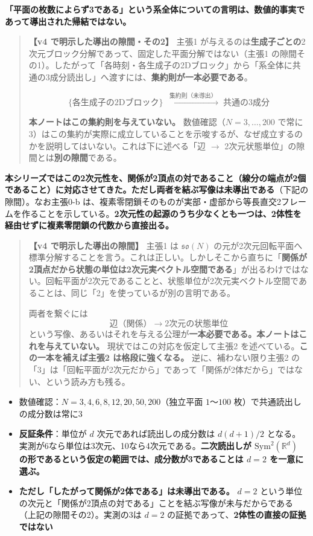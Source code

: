 \documentclass[
  10pt,
]{ltjsarticle}
\providecommand{\tightlist}{%
  \setlength{\itemsep}{0pt}\setlength{\parskip}{0pt}}
\begin{document}
\textbf{「平面の枚数によらず3である」という系全体についての言明は、数値的事実であって導出された帰結ではない。}

\begin{quote}
\textbf{【v4 で明示した導出の隙間・その2】} 主張1
が与えるのは\textbf{生成子ごとの}2次元ブロック分解であって、固定した平面分解ではない（主張1
の隙間その1）。したがって「各時刻・各生成子の2Dブロック」から「系全体に共通の3成分読出し」へ渡すには、\textbf{集約則が一本必要である}。

\[\{\text{各生成子の2Dブロック}\} \;\xrightarrow{\;\text{集約則（未導出）}\;}\; \text{共通の3成分}\]

\textbf{本ノートはこの集約則を与えていない。}
数値確認（\(N = 3,\dots,200\)
で常に3）はこの集約が実際に成立していることを示唆するが、なぜ成立するのかを説明してはいない。これは下に述べる「辺
\(\to\) 2次元状態単位」の隙間とは\textbf{別の隙間}である。
\end{quote}

\textbf{本シリーズではこの2次元性を、関係が2頂点の対であること（線分の端点が2個であること）に対応させてきた。ただし両者を結ぶ写像は未導出である}（下記の隙間）。なお主張0-b
は、複素零閉鎖そのものが実部・虚部から等長直交2フレームを作ることを示している。\textbf{2次元性の起源のうち少なくとも一つは、2体性を経由せずに複素零閉鎖の代数から直接出る。}

\begin{quote}
\textbf{【v4 で明示した導出の隙間】} 主張1 は \(\mathfrak{so}(N)\)
の元が2次元回転平面へ標準分解することを言う。これは正しい。しかしそこから直ちに「\textbf{関係が2頂点だから状態の単位は2次元実ベクトル空間である}」が出るわけではない。回転平面が2次元であることと、状態単位が2次元実ベクトル空間であることは、同じ「2」を使っているが別の言明である。

両者を繋ぐには
\[\text{辺（関係）} \;\longrightarrow\; \text{2次元の状態単位}\]
という写像、あるいはそれを与える公理が\textbf{一本必要である。本ノートはこれを与えていない。}
現状ではこの対応を仮定して主張2
を述べている。\textbf{この一本を補えば主張2 は格段に強くなる。}
逆に、補わない限り主張2
の「3」は「回転平面が2次元だから」であって「関係が2体だから」ではない、という読み方も残る。
\end{quote}

\begin{itemize}
\tightlist
\item
  数値確認：\(N = 3,4,6,8,12,20,50,200\)（独立平面 \(1\)〜\(100\)
  枚）で共通読出しの成分数は常に3
\item
  \textbf{反証条件}：単位が \(d\) 次元であれば読出しの成分数は
  \(d(d+1)/2\)
  となる。実測が6なら単位は3次元、10なら4次元である。\textbf{二次読出しが
  \(\mathrm{Sym}^2(\mathbb{R}^d)\)
  の形であるという仮定の範囲では、成分数が3であることは \(d=2\)
  を一意に選ぶ。}
\item
  \textbf{ただし「したがって関係が2体である」は未導出である。} \(d=2\)
  という単位の次元と「関係が2頂点の対である」ことを結ぶ写像が未与だからである（上記の隙間その2）。実測の3は
  \(d=2\) の証拠であって、\textbf{2体性の直接の証拠ではない}
\end{itemize}
\end{document}
